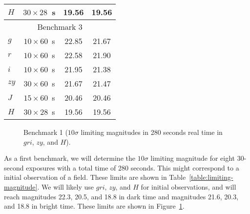 \documentclass{article}
\newcommand{\micron}{\mbox{$\mu$m}}
\begin{document}
\begin{table}
\begin{center}
\begin{tabular}{lccc}
$H$  &$\phantom{}30 \times 28$~s&19.56&19.56\\
\hline
\multicolumn{4}{c}{Benchmark 3}\\
\hline
$g$  &$\phantom{}10 \times 60$~s&22.85&21.67\\
$r$  &$\phantom{}10 \times 60$~s&22.58&21.90\\
$i$  &$\phantom{}10 \times 60$~s&21.95&21.38\\
$zy$ &$\phantom{}30 \times 60$~s&21.67&21.47\\
$J$  &$\phantom{}15 \times 60$~s&20.46&20.46\\
$H$  &$\phantom{}30 \times 28$~s&19.56&19.56\\
\hline
\end{tabular}
\end{center}
\end{table}

\begin{figure}
\begin{center}
\end{center}
\caption{Benchmark 1 ($10\sigma$ limiting magnitudes in 280 seconds real time in $gri$, $zy$, and $H$).}
\label{figure:limiting-magnitude-1}
\end{figure}

As a first benchmark, we will determine the $10\sigma$ limiting magnitude for eight 30-second exposures with a total time of 280 seconds. This might correspond to a initial observation of a field. These limits are shown in Table~\ref{table:limiting-magnitude}. We will likely use $gri$, $zy$, and $H$ for initial observations, and will reach magnitudes 22.3, 20.5, and 18.8 in dark time and magnitudes 21.6, 20.3, and 18.8 in bright time. These limits are shown in Figure~\ref{figure:limiting-magnitude-1}.
\end{document}
